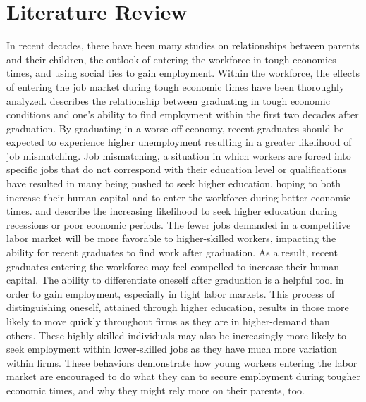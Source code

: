 \documentclass[12pt]{article}
\begin{document}
\section{Literature Review} \label{sec:literature}
In recent decades, there have been many studies on relationships between parents and their children, the outlook of entering the workforce in tough economics times, and using social ties to gain employment. Within the workforce, the effects of entering the job market during tough economic times have been thoroughly analyzed. \cite{kahn_long-term_2010} describes the relationship between graduating in tough economic conditions and one's ability to find employment within the first two decades after graduation. By graduating in a worse-off economy, recent graduates should be expected to experience higher unemployment resulting in a greater likelihood of job mismatching. Job mismatching, a situation in which workers are forced into specific jobs that do not correspond with their education level or qualifications have resulted in many being pushed to seek higher education, hoping to both increase their human capital and to enter the workforce during better economic times. \cite{schwandt_unlucky_2019} and \cite{oreopoulos_short-_2012} describe the increasing likelihood to seek higher education during recessions or poor economic periods. The fewer jobs demanded in a competitive labor market will be more favorable to higher-skilled workers, impacting the ability for recent graduates to find work after graduation. As a result, recent graduates entering the workforce may feel compelled to increase their human capital. The ability to differentiate oneself after graduation is a helpful tool in order to gain employment, especially in tight labor markets. This process of distinguishing oneself, attained through higher education, results in those more likely to move quickly throughout firms as they are in higher-demand than others. These highly-skilled individuals  may also be increasingly more likely to seek employment within lower-skilled jobs as they have much more variation within firms. These behaviors demonstrate how young workers entering the labor market are encouraged to do what they can to secure employment during tougher economic times, and why they might rely more on their parents, too.
\end{document}
